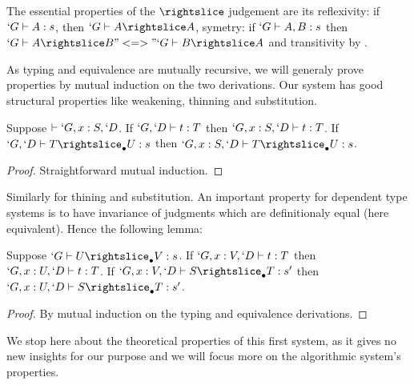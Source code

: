 \documentclass{llncs}
\begin{document}
The essential properties of the $\subd$ judgement are 
its reflexivity: if $`G \vdash A : s$, then $`G \typed A \subd A$,
symetry: if $`G \vdash A, B : s$ then $`G \typed A \subd B "<=>" `G \typed
B \subd A$ and transitivity by .

As typing and equivalence are mutually recursive, we will generaly prove
properties by mutual induction on the two derivations.
Our system has good structural properties like weakening, thinning and
substitution. 

\begin{lemma}[Weakening]
  Suppose $\vdash `G, x : S, `D$.
  If $`G, `D \vdash t : T$ then $`G, x : S, `D \vdash t : T$. 
  If $`G, `D \typed T \sub U : s$ then $`G, x : S, `D \typed T \sub U : s$.
\end{lemma}
\begin{proof}
  Straightforward mutual induction.
\end{proof}

Similarly for thining and substitution. An important property for
dependent type systems is to have invariance of judgments which are
definitionaly equal (here equivalent). Hence the following lemma:
\begin{lemma}
  Suppose $`G \typed U \sub V : s$.
  If $`G, x : V, `D \vdash t : T$ then $`G, x : U, `D \vdash t : T$.
  If $`G, x : V, `D \typed S \sub T : s'$ then
  $`G, x : U, `D \typed S \sub T : s'$.
\end{lemma}
\begin{proof}
  By mutual induction on the typing and equivalence derivations.
\end{proof}

We stop here about the theoretical properties of this first system, as
it gives no new insights for our purpose and we will focus more on the
algorithmic system's properties.
\end{document}
